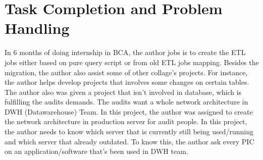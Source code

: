 \section{Task Completion and Problem Handling}
In 6 months of doing internship in BCA, the author jobs is to create the ETL jobs either based on pure query script or from old ETL jobs mapping. Besides the migration, the author also assist some of other collage's projects. For instance, the author helps develop projects that involves some changes on certain tables.\\

The author also was given a project that isn't involved in database, which is fulfilling the audits demands. The audits want a whole network architecture in DWH (Datawarehouse) Team. In this project, the author was assigned to create the network architecture in production server for audit people. In this project, the author needs to know which server that is currently still being used/running and which server that already outdated. To know this, the author ask every PIC on an application/software that's been used in DWH team.